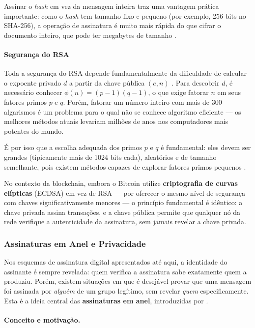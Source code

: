 Assinar o \textit{hash} em vez da mensagem inteira traz uma vantagem prática importante: como o \textit{hash} tem tamanho fixo e pequeno (por exemplo, 256 bits no SHA-256), a operação de assinatura é muito mais rápida do que cifrar o documento inteiro, que pode ter megabytes de tamanho \cite{tomaz2014}.

\paragraph{Segurança do RSA}

Toda a segurança do RSA depende fundamentalmente da dificuldade de calcular o expoente privado $d$ a partir da chave pública $(e, n)$ \cite{tomaz2014}. Para descobrir $d$, é necessário conhecer $\phi(n) = (p-1)(q-1)$, o que exige fatorar $n$ em seus fatores primos $p$ e $q$. Porém, fatorar um número inteiro com mais de 300 algarismos é um problema para o qual não se conhece algoritmo eficiente --- os melhores métodos atuais levariam milhões de anos nos computadores mais potentes do mundo.

É por isso que a escolha adequada dos primos $p$ e $q$ é fundamental: eles devem ser grandes (tipicamente mais de 1024 bits cada), aleatórios e de tamanho semelhante, pois existem métodos capazes de explorar fatores primos pequenos \cite{tomaz2014}.

No contexto da blockchain, embora o Bitcoin utilize \textbf{criptografia de curvas elípticas} (ECDSA) em vez de RSA --- por oferecer o mesmo nível de segurança com chaves significativamente menores --- o princípio fundamental é idêntico: a chave privada assina transações, e a chave pública permite que qualquer nó da rede verifique a autenticidade da assinatura, sem jamais revelar a chave privada.

\subsubsection{Assinaturas em Anel e Privacidade}

Nos esquemas de assinatura digital apresentados até aqui, a identidade do assinante é sempre revelada: quem verifica a assinatura sabe exatamente quem a produziu. Porém, existem situações em que é desejável provar que uma mensagem foi assinada por \textit{alguém} de um grupo legítimo, sem revelar \textit{quem} especificamente. Esta é a ideia central das \textbf{assinaturas em anel}, introduzidas por  \cite{tomaz2014}.

\paragraph{Conceito e motivação.}

